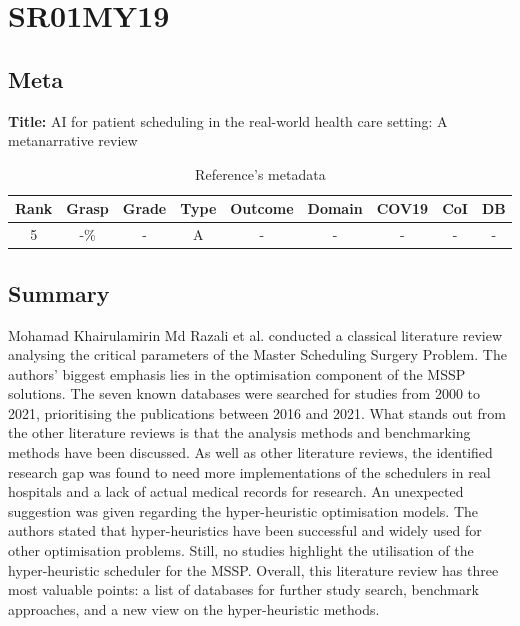 \section{ SR01MY19 }


\subsection{Meta}

    \textbf{Title:}
    AI for patient scheduling in the real-world health care setting: A metanarrative review

    \begin{table}[H]
        \centering
        \begin{tabular}{|c|c|c|c|c|c|c|c|c|}
            \hline
                \textbf{Rank} & \textbf{Grasp} & \textbf{Grade} & \textbf{Type} & \textbf{Outcome} & \textbf{Domain} & \textbf{COV19} & \textbf{CoI} & \textbf{DB} \\
            \hline
                5 & -\% & - & A & - & - & - & - & - \\
            \hline
        \end{tabular}
        \caption{Reference's metadata}
        \label{tab:SR01MY19}
    \end{table}

\subsection{Summary}
    Mohamad Khairulamirin Md Razali et al. conducted a classical literature review analysing the critical parameters of the Master Scheduling Surgery Problem. The authors' biggest emphasis lies in the optimisation component of the MSSP solutions. The seven known databases were searched for studies from 2000 to 2021, prioritising the publications between 2016 and 2021. What stands out from the other literature reviews is that the analysis methods and benchmarking methods have been discussed. As well as other literature reviews, the identified research gap was found to need more implementations of the schedulers in real hospitals and a lack of actual medical records for research. An unexpected suggestion was given regarding the hyper-heuristic optimisation models. The authors stated that hyper-heuristics have been successful and widely used for other optimisation problems. Still, no studies highlight the utilisation of the hyper-heuristic scheduler for the MSSP. Overall, this literature review has three most valuable points: a list of databases for further study search, benchmark approaches, and a new view on the hyper-heuristic methods.
    

